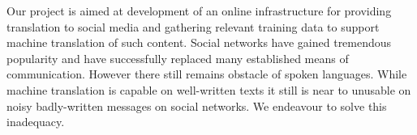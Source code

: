 Our project is aimed at development of an online infrastructure for providing translation to social media and gathering relevant training data to support machine translation of such content. Social networks have gained tremendous popularity and have successfully replaced many established means of communication. However there still remains obstacle of spoken languages. While machine translation is capable on well-written texts it still is near to unusable on noisy badly-written messages on social networks. We endeavour to solve this inadequacy.
